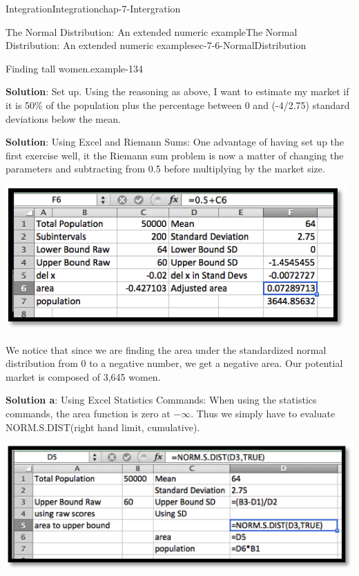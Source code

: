 \documentclass[oneside,10pt,]{book}
\newcommand{\terminology}[1]{\textbf{#1}}
\numberwithin{equation}{section}
\begin{document}
\begin{chapterptx}{Integration}{}{Integration}{}{}{chap-7-Intergration}
\begin{sectionptx}{The Normal Distribution: An extended numeric example}{}{The Normal Distribution: An extended numeric example}{}{}{sec-7-6-NormalDistribution}
\begin{example}{Finding tall women.}{example-134}
\par
\hypertarget{p-2955}{}%
\terminology{Solution}: Set up.  Using the reasoning as above, I want to estimate my market if it is 50\% of the population plus the percentage between 0 and (-4\slash{}2.75) standard deviations below the mean.%
\par
\hypertarget{p-2956}{}%
\terminology{Solution}: Using Excel and Riemann Sums:  One advantage of having set up the first exercise well, it the Riemann sum problem is now a matter of changing the parameters and subtracting from 0.5 before multiplying by the market size.%
\begin{sidebyside}{1}{0.25}{0.25}{0}%
\begin{sbspanel}{0.5}%
\includegraphics[width=1\linewidth]{images/sec7-6-7.png}
\end{sbspanel}%
\end{sidebyside}%
\par
\hypertarget{p-2957}{}%
We notice that since we are finding the area under the standardized normal distribution from 0 to a negative number, we get a negative area.  Our potential market is composed of 3,645 women.%
\par
\hypertarget{p-2958}{}%
\terminology{Solution a}: Using Excel Statistics Commands:  When using the statistics commands, the area function is zero at \(-\infty\).  Thus we simply have to evaluate%
 NORM.S.DIST(right hand limit, cumulative). \begin{sidebyside}{1}{0.2}{0.2}{0}%
\begin{sbspanel}{0.6}%
\includegraphics[width=1\linewidth]{images/sec7-6-8.png}

\end{sbspanel}
\end{sidebyside}
\end{example}
\end{sectionptx}
\end{chapterptx}
\end{document}
